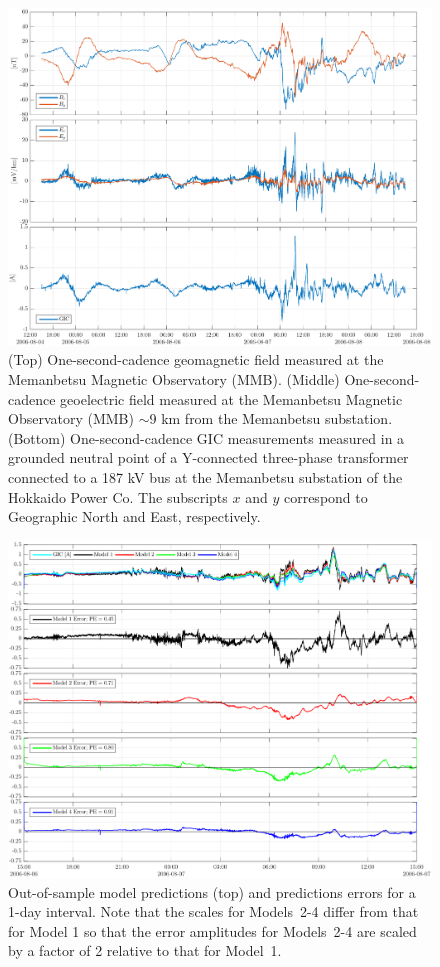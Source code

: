 \documentclass[draft,linenumbers]{agujournal2018}
\begin{document}
\begin{figure}[h]
\centering
\includegraphics[width=\textwidth]{figures/plot_raw_All_20060805.pdf}
\caption{(Top) One-second-cadence geomagnetic field measured at the Memanbetsu Magnetic Observatory (MMB). (Middle) One-second-cadence geoelectric field measured at the Memanbetsu Magnetic Observatory (MMB) $\sim$9 km from the Memanbetsu substation. (Bottom) One-second-cadence GIC measurements measured in a grounded neutral point of a Y-connected three-phase transformer connected to a 187 kV bus at the Memanbetsu substation of the Hokkaido Power Co. The subscripts $x$ and $y$ correspond to Geographic North and East, respectively.}
\label{sample}
\end{figure}

\begin{figure}[h]
\centering
\includegraphics[width=\textwidth]{figures/plot_model_predictions-MeanModel-2006-08-06.pdf}
\caption{Out-of-sample model predictions (top) and predictions errors for a 1-day interval. Note that the scales for Models~2-4 differ from that for Model 1 so that the error amplitudes for Models~2-4 are scaled by a factor of 2 relative to that for Model~1.}
\label{predictions}
\end{figure}
\end{document}
